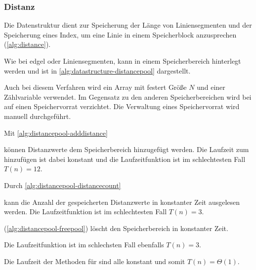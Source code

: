 \subsubsection{Distanz} %
\label{sub:distanz}

Die Datenstruktur  dient zur Speicherung der Länge von Liniensegmenten und der Speicherung eines
 Index, um eine Linie in einem Speicherblock anzusprechen (\autoref{alg:distance}).


Wie bei \gls{edgel} oder Liniensegmenten, kann  in einem Speicherbereich hinterlegt werden und ist
 in \autoref{alg:datastructure-distancepool} dargestellt.

Auch bei diesem Verfahren wird ein Array mit festert Größe $N$ und einer Zählvariable verwendet. Im Gegensatz zu den
 anderen Speicherbereichen wird bei  auf einen Speichervorrat verzichtet. Die Verwaltung eines
 Speichervorrat wird manuell durchgeführt.

% 
% 

Mit \autoref{alg:distancepool-adddistance}

können Distanzwerte dem Speicherbereich hinzugefügt werden. Die Laufzeit zum hinzufügen ist dabei konstant und die
 Laufzeitfunktion ist im schlechtesten Fall $T(n) = 12$.

Durch \autoref{alg:distancepool-distancecount}

 kann die Anzahl der gespeicherten Distanzwerte in konstanter Zeit ausgelesen werden. Die Laufzeitfunktion ist im schlechtesten Fall $T(n) = 3$.

 (\autoref{alg:distancepool-freepool}) löscht den Speicherbereich in konstanter Zeit.

Die Laufzeitfunktion ist im schlechsten Fall ebenfalls $T(n) = 3$.

Die Laufzeit der Methoden für  sind alle konstant und somit $T(n)=\Theta(1)$.


